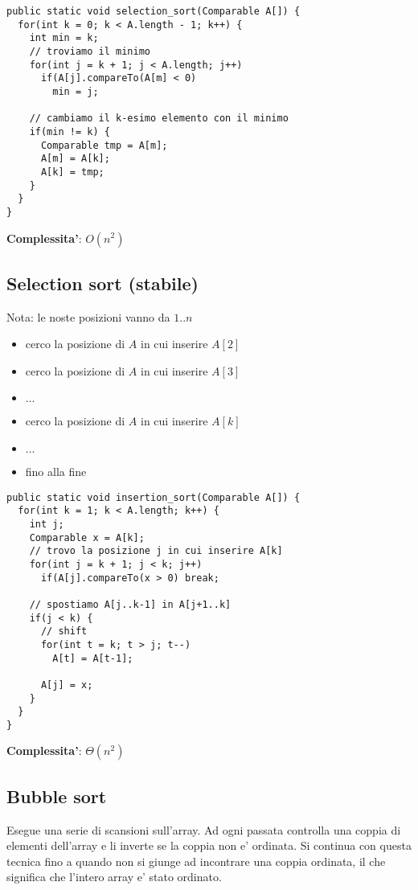 \documentclass{article}
\begin{document}
\begin{lstlisting}
public static void selection_sort(Comparable A[]) {
  for(int k = 0; k < A.length - 1; k++) {
    int min = k;
    // troviamo il minimo
    for(int j = k + 1; j < A.length; j++)
      if(A[j].compareTo(A[m] < 0)
        min = j;

    // cambiamo il k-esimo elemento con il minimo
    if(min != k) {
      Comparable tmp = A[m];
      A[m] = A[k];
      A[k] = tmp;
    }
  }
}
\end{lstlisting}

\textbf{Complessita'}: $O(n^2)$

\subsection{Selection sort (stabile)}

Nota: le noste posizioni vanno da $1..n$
\begin{itemize}
  \item cerco la posizione di $A$ in cui inserire $A[2]$
  \item cerco la posizione di $A$ in cui inserire $A[3]$
  \item $\ldots$
  \item cerco la posizione di $A$ in cui inserire $A[k]$
  \item $\ldots$
  \item fino alla fine
\end{itemize}

\begin{lstlisting}
public static void insertion_sort(Comparable A[]) {
  for(int k = 1; k < A.length; k++) {
    int j;
    Comparable x = A[k];
    // trovo la posizione j in cui inserire A[k]
    for(int j = k + 1; j < k; j++)
      if(A[j].compareTo(x > 0) break;

    // spostiamo A[j..k-1] in A[j+1..k]
    if(j < k) {
      // shift
      for(int t = k; t > j; t--)
        A[t] = A[t-1];

      A[j] = x;
    }
  }
}
\end{lstlisting}

\textbf{Complessita'}: $\Theta(n^2)$

\subsection{Bubble sort}

Esegue una serie di scansioni sull'array. Ad ogni passata controlla una coppia
di elementi dell'array e li inverte se la coppia non e' ordinata. Si continua con
questa tecnica fino a quando non si giunge ad incontrare una coppia ordinata, il che
significa che l'intero array e' stato ordinato.
\end{document}
